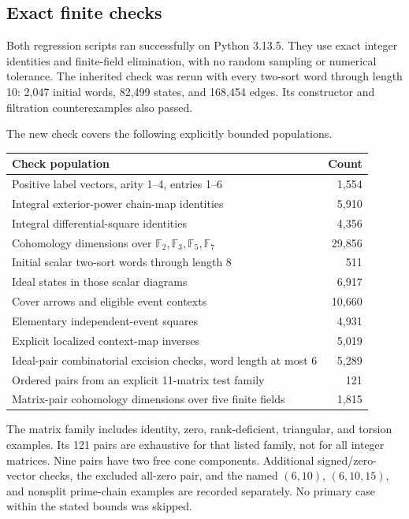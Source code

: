 \documentclass[11pt]{article}
\theoremstyle{definition}
\theoremstyle{remark}
\begin{document}
\subsection{Exact finite checks}
Both regression scripts ran successfully on Python 3.13.5. They use exact integer identities and finite-field elimination, with no random sampling or numerical tolerance. The inherited check was rerun with every two-sort word through length 10: 2,047 initial words, 82,499 states, and 168,454 edges. Its constructor and filtration counterexamples also passed.

The new check covers the following explicitly bounded populations.
\begin{center}
\begin{tabular}{p{}r}
\toprule
Check population & Count\\
\midrule
Positive label vectors, arity 1--4, entries 1--6 & 1,554\\
Integral exterior-power chain-map identities & 5,910\\
Integral differential-square identities & 4,356\\
Cohomology dimensions over $\mathbb F_2,\mathbb F_3,\mathbb F_5,\mathbb F_7$ & 29,856\\
Initial scalar two-sort words through length 8 & 511\\
Ideal states in those scalar diagrams & 6,917\\
Cover arrows and eligible event contexts & 10,660\\
Elementary independent-event squares & 4,931\\
Explicit localized context-map inverses & 5,019\\
Ideal-pair combinatorial excision checks, word length at most 6 & 5,289\\
Ordered pairs from an explicit 11-matrix test family & 121\\
Matrix-pair cohomology dimensions over five finite fields & 1,815\\
\bottomrule
\end{tabular}
\end{center}

The matrix family includes identity, zero, rank-deficient, triangular, and torsion examples. Its 121 pairs are exhaustive for that listed family, not for all integer matrices. Nine pairs have two free cone components. Additional signed/zero-vector checks, the excluded all-zero pair, and the named $(6,10)$, $(6,10,15)$, and nonsplit prime-chain examples are recorded separately. No primary case within the stated bounds was skipped.
\end{document}
